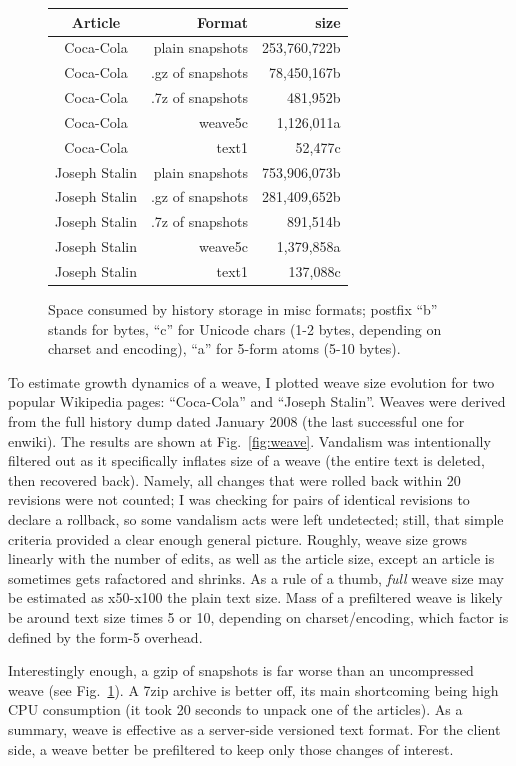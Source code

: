 \documentclass{acm_proc_article-sp}
\begin{document}
\begin{figure} 
\begin{tabular*}{0.48\textwidth}{@{\extracolsep{\fill}}|c|r|r|}
\hline
Article & Format & size \\
\hline
Coca-Cola & plain snapshots & 253,760,722b \\
Coca-Cola & .gz of snapshots & 78,450,167b \\
Coca-Cola & .7z of snapshots & 481,952b \\
Coca-Cola & weave5c & 1,126,011a \\
Coca-Cola & text1 & 52,477c \\
Joseph Stalin & plain snapshots & 753,906,073b \\
Joseph Stalin & .gz of snapshots & 281,409,652b \\
Joseph Stalin & .7z of snapshots & 891,514b\\
Joseph Stalin & weave5c & 1,379,858a \\
Joseph Stalin & text1 & 137,088c \\
\hline
\end{tabular*}
\caption{Space consumed by history storage in misc formats; postfix ``b'' stands for bytes, ``c'' for Unicode chars (1-2 bytes, depending on charset and encoding), ``a'' for 5-form atoms (5-10 bytes).} \label{fig:sizes}
\end{figure}

To estimate growth dynamics of a weave, I plotted
weave size evolution for two popular Wikipedia pages: ``Coca-Cola''
and ``Joseph Stalin''. Weaves were derived from the full
history dump dated January 2008 (the last successful one
for enwiki). The results are shown at Fig.~\ref{fig:weave}.
Vandalism was intentionally filtered out as it specifically
inflates size of a weave (the entire text is deleted, then
recovered back). Namely, all changes that were rolled back
within 20 revisions were not counted; I was checking for
pairs of identical revisions to declare a rollback, so
some vandalism acts were left undetected; still, that simple
criteria provided a clear enough general picture.
Roughly, weave size grows linearly with the number of edits,
as well as the article size, except an article is sometimes
gets rafactored and shrinks. As a rule of a thumb, \emph{full} weave
size may be estimated as x50-x100 the plain text size.
Mass of a prefiltered weave is likely be around
text size times 5 or 10, depending on charset/encoding,
which factor is defined by the form-5 overhead.

Interestingly enough, a gzip of
snapshots is far worse than an uncompressed weave (see
Fig.~\ref{fig:sizes}). A
7zip archive is better off, its main shortcoming being high CPU
consumption (it took 20 seconds to unpack one of the articles).
As a summary, weave is effective as a server-side versioned
text format. For the client side, a weave better be prefiltered
to keep only those changes of interest.
\end{document}
